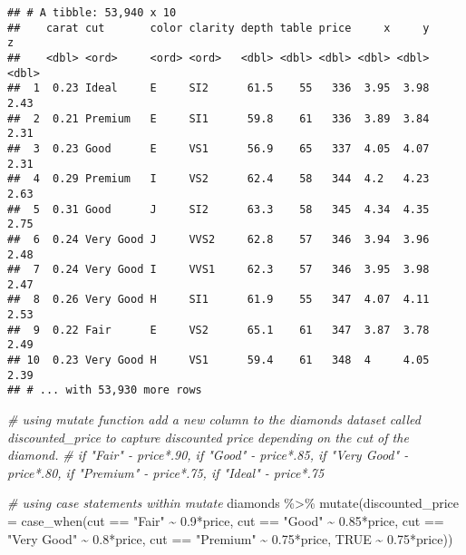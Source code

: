 \documentclass[
]{article}
\newenvironment{Shaded}{\begin{snugshade}}{\end{snugshade}}
\newcommand{\AttributeTok}[1]{\textcolor[rgb]{0.77,0.63,0.00}{#1}}
\newcommand{\CommentTok}[1]{\textcolor[rgb]{0.56,0.35,0.01}{\textit{#1}}}
\newcommand{\ConstantTok}[1]{\textcolor[rgb]{0.00,0.00,0.00}{#1}}
\newcommand{\FloatTok}[1]{\textcolor[rgb]{0.00,0.00,0.81}{#1}}
\newcommand{\FunctionTok}[1]{\textcolor[rgb]{0.00,0.00,0.00}{#1}}
\newcommand{\NormalTok}[1]{#1}
\newcommand{\SpecialCharTok}[1]{\textcolor[rgb]{0.00,0.00,0.00}{#1}}
\newcommand{\StringTok}[1]{\textcolor[rgb]{0.31,0.60,0.02}{#1}}
\begin{document}
\begin{verbatim}
## # A tibble: 53,940 x 10
##    carat cut       color clarity depth table price     x     y     z
##    <dbl> <ord>     <ord> <ord>   <dbl> <dbl> <dbl> <dbl> <dbl> <dbl>
##  1  0.23 Ideal     E     SI2      61.5    55   336  3.95  3.98  2.43
##  2  0.21 Premium   E     SI1      59.8    61   336  3.89  3.84  2.31
##  3  0.23 Good      E     VS1      56.9    65   337  4.05  4.07  2.31
##  4  0.29 Premium   I     VS2      62.4    58   344  4.2   4.23  2.63
##  5  0.31 Good      J     SI2      63.3    58   345  4.34  4.35  2.75
##  6  0.24 Very Good J     VVS2     62.8    57   346  3.94  3.96  2.48
##  7  0.24 Very Good I     VVS1     62.3    57   346  3.95  3.98  2.47
##  8  0.26 Very Good H     SI1      61.9    55   347  4.07  4.11  2.53
##  9  0.22 Fair      E     VS2      65.1    61   347  3.87  3.78  2.49
## 10  0.23 Very Good H     VS1      59.4    61   348  4     4.05  2.39
## # ... with 53,930 more rows
\end{verbatim}

\begin{Shaded}
\begin{Highlighting}[]
\CommentTok{\# using mutate function add a new column to the diamonds dataset called discounted\_price to capture discounted price depending on the cut of the diamond.  }
\CommentTok{\# if "Fair" {-} price*.90, if "Good" {-} price*.85, if "Very Good" {-} price*.80, if "Premium" {-} price*.75, if "Ideal" {-} price*.75}

\CommentTok{\# using case statements within mutate}
\NormalTok{diamonds }\SpecialCharTok{\%\textgreater{}\%}
  \FunctionTok{mutate}\NormalTok{(}\AttributeTok{discounted\_price =} \FunctionTok{case\_when}\NormalTok{(cut }\SpecialCharTok{==} \StringTok{"Fair"} \SpecialCharTok{\textasciitilde{}} \FloatTok{0.9}\SpecialCharTok{*}\NormalTok{price,}
\NormalTok{                                      cut }\SpecialCharTok{==} \StringTok{"Good"} \SpecialCharTok{\textasciitilde{}} \FloatTok{0.85}\SpecialCharTok{*}\NormalTok{price,}
\NormalTok{                                      cut }\SpecialCharTok{==} \StringTok{"Very Good"} \SpecialCharTok{\textasciitilde{}} \FloatTok{0.8}\SpecialCharTok{*}\NormalTok{price,}
\NormalTok{                                      cut }\SpecialCharTok{==} \StringTok{"Premium"} \SpecialCharTok{\textasciitilde{}} \FloatTok{0.75}\SpecialCharTok{*}\NormalTok{price,}
                                      \ConstantTok{TRUE} \SpecialCharTok{\textasciitilde{}} \FloatTok{0.75}\SpecialCharTok{*}\NormalTok{price))}
\end{Highlighting}
\end{Shaded}
\end{document}
